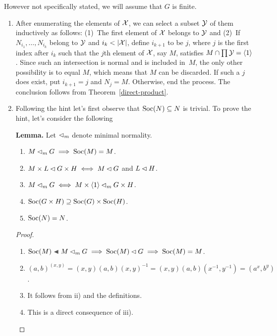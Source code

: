 \begin{solution} However not specifically stated, we will assume that $G$ is finite.

\begin{enumerate}[\rm a)]
    \item After enumerating the elements of $\cal X$, we can select a subset $\cal Y$ of them inductively as follows: (1)~The first element of $\cal X$ belongs to $\cal Y$ and (2)~If $N_{i_1},\dots,N_{i_k}$ belong to $\cal Y$ and $i_k<|{\cal X}|$, define $i_{k+1}$ to be $j$, where $j$ is the first index after $i_k$ such that the $j$th element of $\cal X$, say $M$, satisfies $M\cap\prod{\cal Y}=\langle1\rangle$. Since such an intersection is normal and is included in~$M$, the only other possibility is to equal $M$, which means that $M$ can be discarded. If such a $j$ does exist, put $i_{k+1}=j$ and $N_j=M$. Otherwise, end the process. The conclusion follows from Theorem~\ref{direct-product}.

    \item Following the hint let's first observe that ${\rm Soc}(N)\subseteq N$ is trivial. To prove the hint, let's consider the following

    \textbf{Lemma.} Let $\lhd_m$ denote minimal normality. 
    \begin{enumerate}[\rm i)]
        \item $M\lhd_mG\implies{\rm Soc}(M)=M$.
        \item $M\times L\lhd G\times H\iff M\lhd G$ and $L\lhd H$.
        \item $M\lhd_mG\iff M\times\langle1\rangle\lhd_mG\times H$.
        \item ${\rm Soc}(G\times H)\supseteq{\rm Soc}(G)\times{\rm Soc}(H)$.
        \item ${\rm Soc}(N)=N$.
    \end{enumerate}

    \begin{proof}${}$ 
    \begin{enumerate}[\rm i)]
        \item $\Soc(M)\ch M\normal_mG\implies\Soc(M)\normal G\implies\Soc(M)=M$.
        \item $(a,b)^{(x,y)} = (x,y)(a,b)(x,y)^{-1} = (x,y)(a,b)(x^{-1},y^{-1})=(a^x,b^y)$.
        \item It follows from ii) and the definitions.
        \item This is a direct consequence of iii).


\end{enumerate}
\end{proof}
\end{enumerate}
\end{solution}

